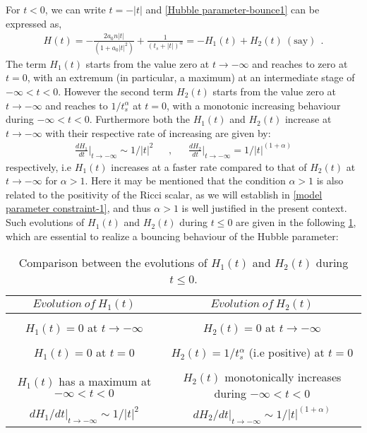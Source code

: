 \documentclass{article}
\begin{document}
For $t < 0$, we can write $t = -|t|$ and \ref{Hubble parameter-bounce1} can be expressed as,
\begin{eqnarray}
 H(t) = -\frac{2a_0n|t|}{\left(1 + a_0|t|^2\right)} + \frac{1}{\left(t_s + |t|\right)^{\alpha}} = -H_1(t) + H_2(t)~(\mathrm{say})~~.
 \label{Hubble parameter-bounce2}
\end{eqnarray}
The term $H_1(t)$ starts from the value zero at $t \rightarrow -\infty$ and reaches to zero at $t = 0$, with an extremum (in particular, a maximum) 
at an intermediate stage of $-\infty < t < 0$. However the second term $H_2(t)$ starts from the value zero at $t \rightarrow -\infty$ and reaches 
to $1/t_s^{\alpha}$ at $t = 0$, with a monotonic increasing behaviour during $-\infty < t < 0$. 
Furthermore both the $H_1(t)$ and $H_2(t)$ increase at 
$t \rightarrow -\infty$ with their respective rate of increasing are given by: 
\begin{eqnarray}
 \frac{dH_1}{dt}\bigg|_{t\rightarrow -\infty} \sim 1/|t|^2~~~~~~~,~~~~~~~ \frac{dH_2}{dt}\bigg|_{t\rightarrow -\infty} = 1/|t|^{(1+\alpha)}\nonumber
\end{eqnarray}
respectively, i.e $H_1(t)$ increases at a faster rate compared to that of $H_2(t)$ at $t \rightarrow -\infty$ for $\alpha > 1$. 
Here it may be mentioned that the condition $\alpha > 1$ is also related to the positivity of the Ricci scalar, as 
we will establish in \ref{model parameter constraint-1}, and thus $\alpha > 1$ is well justified in the present context. 
Such evolutions of $H_1(t)$ and $H_2(t)$ during $t \leq 0$ are given in the following \ref{Table-1}, 
which are essential to realize a bouncing behaviour of the Hubble parameter:\\

 \begin{table}[t]
  \centering
  \begin{tabular}{|c|c|}
   \hline 
  $Evolution~of~H_1(t)$  & $Evolution~of~H_2(t)$\\
  \hline
   \hline\\
   $H_1(t) = 0$ at $t\rightarrow -\infty$ & $H_2(t) = 0$ at $t\rightarrow -\infty$ \\
   \hline\\
   $H_1(t) = 0$ at $t = 0$ & $H_2(t) = 1/t_s^{\alpha}$ (i.e positive) at $t = 0$ \\
   \hline\\
   $H_1(t)$ has a maximum at $-\infty < t < 0$ & $H_2(t)$ monotonically increases during $-\infty < t < 0$ \\
   \hline
   $dH_1/dt\bigg|_{t\rightarrow -\infty} \sim 1/|t|^2$ & $dH_2/dt\bigg|_{t\rightarrow -\infty} \sim 1/|t|^{(1+\alpha)}$ \\
   \hline
   \hline
  \end{tabular}%
  \caption{Comparison between the evolutions of $H_1(t)$ and $H_2(t)$ during $t \leq 0$.}
  \label{Table-1}
 \end{table}
 
\end{document}
